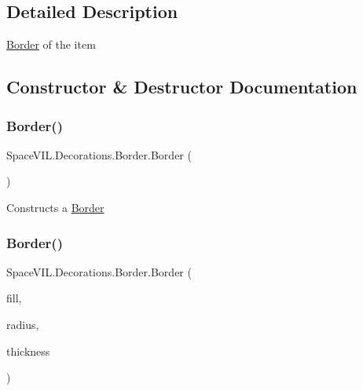 \subsection{Detailed Description}
\mbox{\hyperlink{class_space_v_i_l_1_1_decorations_1_1_border}{Border}} of the item 



\subsection{Constructor \& Destructor Documentation}
\mbox{\label{class_space_v_i_l_1_1_decorations_1_1_border_af401ed881c34ee207e39331b96545211}} 
\subsubsection{\texorpdfstring{Border()}{Border()}\hspace{0.1cm}{\footnotesize\ttfamily [1/2]}}
{\footnotesize\ttfamily Space\+V\+I\+L.\+Decorations.\+Border.\+Border (\begin{DoxyParamCaption}{ }\end{DoxyParamCaption})}



Constructs a \mbox{\hyperlink{class_space_v_i_l_1_1_decorations_1_1_border}{Border}} 

\mbox{\label{class_space_v_i_l_1_1_decorations_1_1_border_a11c41056821fcf5455863b0009127d2e}} 
\subsubsection{\texorpdfstring{Border()}{Border()}\hspace{0.1cm}{\footnotesize\ttfamily [2/2]}}
{\footnotesize\ttfamily Space\+V\+I\+L.\+Decorations.\+Border.\+Border (\begin{DoxyParamCaption}\item[{Color}]{fill,  }\item[{\mbox{\hyperlink{class_space_v_i_l_1_1_decorations_1_1_corner_radius}{Corner\+Radius}}}]{radius,  }\item[{int}]{thickness }\end{DoxyParamCaption})}




